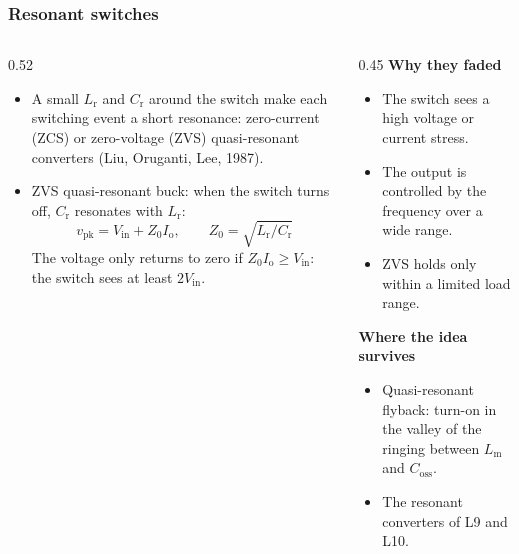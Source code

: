 \begin{frame}
	\frametitle{Resonant switches}
	\begin{columns}[T]
		\begin{column}{0.52\textwidth}
			\small
			\begin{itemize}
				\item A small $L_\mathrm{r}$ and $C_\mathrm{r}$ around the switch make each switching event a short resonance: zero-current (ZCS) or zero-voltage (ZVS) quasi-resonant converters (Liu, Oruganti, Lee, 1987).
				\item ZVS quasi-resonant buck: when the switch turns off, $C_\mathrm{r}$ resonates with $L_\mathrm{r}$:
				      \begin{equation*}
					      v_\mathrm{pk}=V_\mathrm{in}+Z_0I_\mathrm{o},\qquad Z_0=\sqrt{L_\mathrm{r}/C_\mathrm{r}}
				      \end{equation*}
				      The voltage only returns to zero if $Z_0I_\mathrm{o}\geq V_\mathrm{in}$: the switch sees at least $2V_\mathrm{in}$.
			\end{itemize}
		\end{column}
		\begin{column}{0.45\textwidth}
			\small
			\textbf{Why they faded}
			\begin{itemize}
				\item The switch sees a high voltage or current stress.
				\item The output is controlled by the frequency over a wide range.
				\item ZVS holds only within a limited load range.
			\end{itemize}
			\textbf{Where the idea survives}
			\begin{itemize}
				\item Quasi-resonant flyback: turn-on in the valley of the ringing between $L_\mathrm{m}$ and $C_\mathrm{oss}$.
				\item The resonant converters of L9 and L10.
			\end{itemize}
		\end{column}
	\end{columns}
\end{frame}

